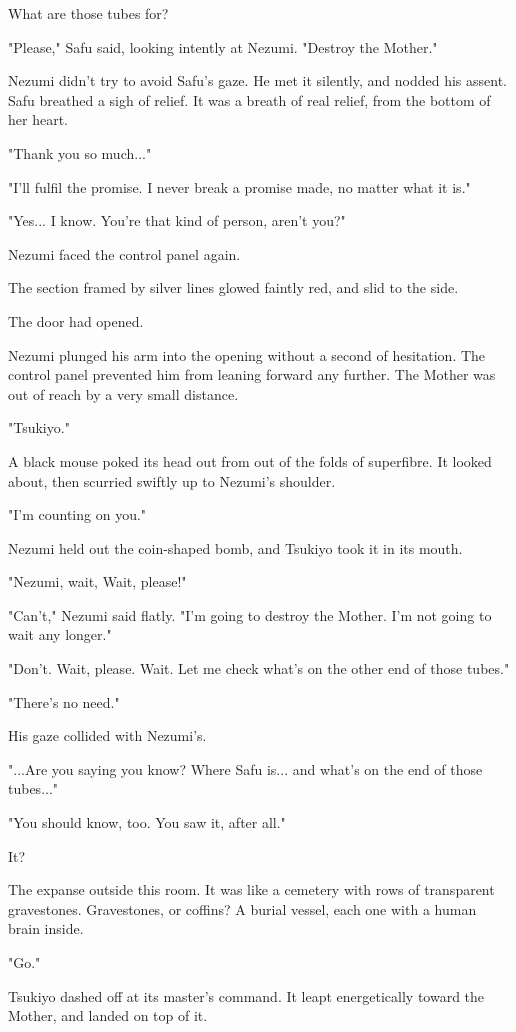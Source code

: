 What are those tubes for?

"Please," Safu said, looking intently at Nezumi. "Destroy the Mother."

Nezumi didn't try to avoid Safu's gaze. He met it silently, and nodded
his assent. Safu breathed a sigh of relief. It was a breath of real
relief, from the bottom of her heart.

"Thank you so much..."

"I'll fulfil the promise. I never break a promise made, no matter what
it is."

"Yes... I know. You're that kind of person, aren't you?"

Nezumi faced the control panel again.

The section framed by silver lines glowed faintly red, and slid to the
side.

The door had opened.

Nezumi plunged his arm into the opening without a second of hesitation.
The control panel prevented him from leaning forward any further. The
Mother was out of reach by a very small distance.

"Tsukiyo."

A black mouse poked its head out from out of the folds of superfibre. It
looked about, then scurried swiftly up to Nezumi's shoulder.

"I'm counting on you."

Nezumi held out the coin-shaped bomb, and Tsukiyo took it in its mouth.

"Nezumi, wait, Wait, please!"

"Can't," Nezumi said flatly. "I'm going to destroy the Mother. I'm not
going to wait any longer."

"Don't. Wait, please. Wait. Let me check what's on the other end of
those tubes."

"There's no need."

His gaze collided with Nezumi's.

"...Are you saying you know? Where Safu is... and what's on the end of
those tubes..."

"You should know, too. You saw it, after all."

It?

The expanse outside this room. It was like a cemetery with rows of
transparent gravestones. Gravestones, or coffins? A burial vessel, each
one with a human brain inside.

"Go."

Tsukiyo dashed off at its master's command. It leapt energetically
toward the Mother, and landed on top of it.

